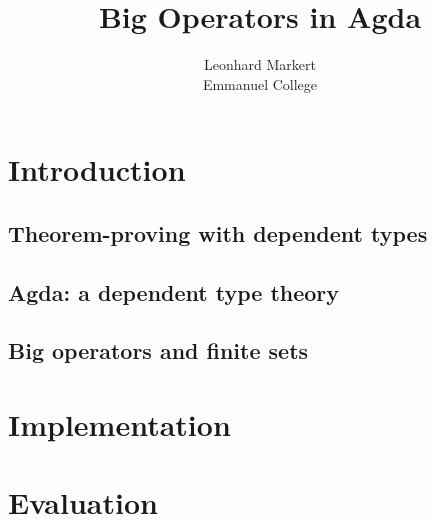

\title{Big Operators in Agda}
\author{Leonhard Markert \\ Emmanuel College}



\begin{titlepage}
\maketitle
\tableofcontents
\end{titlepage}

\chapter{Introduction}

\section{Theorem-proving with dependent types}

\section{Agda: a dependent type theory}

\section{Big operators and finite sets}

\chapter{Implementation}

\chapter{Evaluation}


